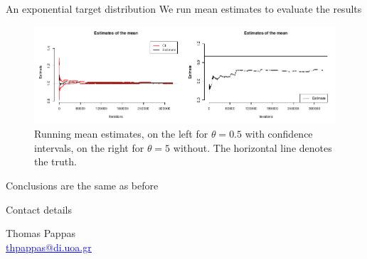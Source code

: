 \documentclass{beamer}
\newcommand{\link}[2]{\href{#1}{\textcolor{blue}{\underline{#2}}}}
\begin{document}
\begin{frame}{An exponential target distribution}
We run mean estimates to evaluate the results
  \begin{figure}[h]
    \includegraphics[width=1\textwidth]{example1_mean_estimates}
    \caption{Running mean estimates, on the left for $\theta = 0.5$ with confidence intervals, on the right for $\theta = 5$ without. The horizontal line denotes the truth.}
  \end{figure}
  Conclusions are the same as before
\end{frame}

%

\begin{frame}{Contact details}
  \begin{center}
    Thomas Pappas\\
    \link{mailto:thpappas@di.uoa.gr}{thpappas@di.uoa.gr}
  \end{center}
\end{frame}
\end{document}
